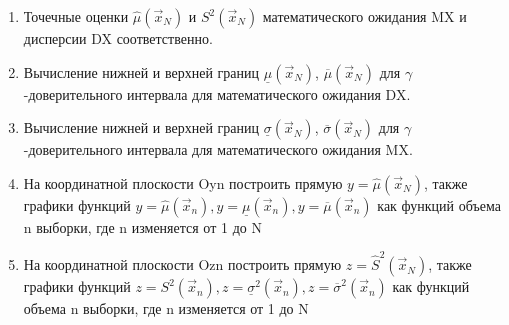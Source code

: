 \documentclass[a4paper,oneside,12pt]{extreport}
\theoremstyle{indented}
\begin{document}
\begin{enumerate}
\item Точечные оценки $\hat \mu (\vec x_N)$ и $ S^2 (\vec x_N)$ математического ожидания MX и дисперсии DX соответственно. 
\item Вычисление нижней и верхней границ $\underline \mu (\vec x_N)$, $\overline \mu (\vec x_N)$ для $\gamma$-доверительного интервала для математического ожидания DX. 
\item Вычисление нижней и верхней границ $\underline \sigma (\vec x_N)$, $\overline \sigma (\vec x_N)$ для $\gamma$-доверительного интервала для математического ожидания MX. 


\item На координатной плоскости Oyn построить прямую $y=\hat \mu (\vec x_N)$, также графики функций $y=\hat \mu (\vec x_n), y= \underline \mu (\vec x_n), y =\overline \mu (\vec x_n)$ как функций объема n выборки, где n изменяется от 1 до N


\newpage

\item На координатной плоскости Ozn построить прямую $z=\hat S^2 (\vec x_N)$, также графики функций $z= S^2 (\vec x_n), z= \underline \sigma^2 (\vec x_n), z =\overline \sigma^2 (\vec x_n)$ как функций объема n выборки, где n изменяется от 1 до N


\end{enumerate}
\end{document}
